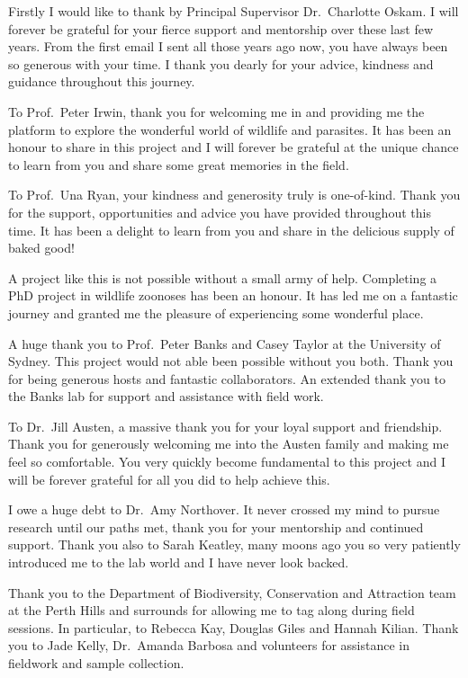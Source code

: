 \documentclass[a4paper, nobind]{templates/ociamthesis}
\begin{document}
\begin{romanpages}


\begin{acknowledgements}
 	Firstly I would like to thank by Principal Supervisor Dr.~Charlotte Oskam.
  I will forever be grateful for your fierce support and mentorship over these last few years.
  From the first email I sent all those years ago now, you have always been so generous with your time.
  I thank you dearly for your advice, kindness and guidance throughout this journey.

  To Prof.~Peter Irwin, thank you for welcoming me in and providing me the platform to explore the wonderful world of wildlife and parasites.
  It has been an honour to share in this project and I will forever be grateful at the unique chance to learn from you and share some great memories in the field.

  To Prof.~Una Ryan, your kindness and generosity truly is one-of-kind.
  Thank you for the support, opportunities and advice you have provided throughout this time.
  It has been a delight to learn from you and share in the delicious supply of baked good!

  A project like this is not possible without a small army of help. Completing a PhD project in wildlife zoonoses has been an honour.
  It has led me on a fantastic journey and granted me the pleasure of experiencing some wonderful place.

  A huge thank you to Prof.~Peter Banks and Casey Taylor at the University of Sydney. This project would not able been possible without you both. Thank you for being generous hosts and fantastic collaborators. An extended thank you to the Banks lab for support and assistance with field work.

  To Dr.~Jill Austen, a massive thank you for your loyal support and friendship.
  Thank you for generously welcoming me into the Austen family and making me feel so comfortable. You very quickly become fundamental to this project and I will be forever grateful for all you did to help achieve this.

  I owe a huge debt to Dr.~Amy Northover. It never crossed my mind to pursue research until our paths met, thank you for your mentorship and continued support. Thank you also to Sarah Keatley, many moons ago you so very patiently introduced me to the lab world and I have never look backed.

  Thank you to the Department of Biodiversity, Conservation and Attraction team at the Perth Hills and surrounds for allowing me to tag along during field sessions. In particular, to Rebecca Kay, Douglas Giles and Hannah Kilian. Thank you to Jade Kelly, Dr.~Amanda Barbosa and volunteers for assistance in fieldwork and sample collection.


\end{acknowledgements}
\end{romanpages}
\end{document}
